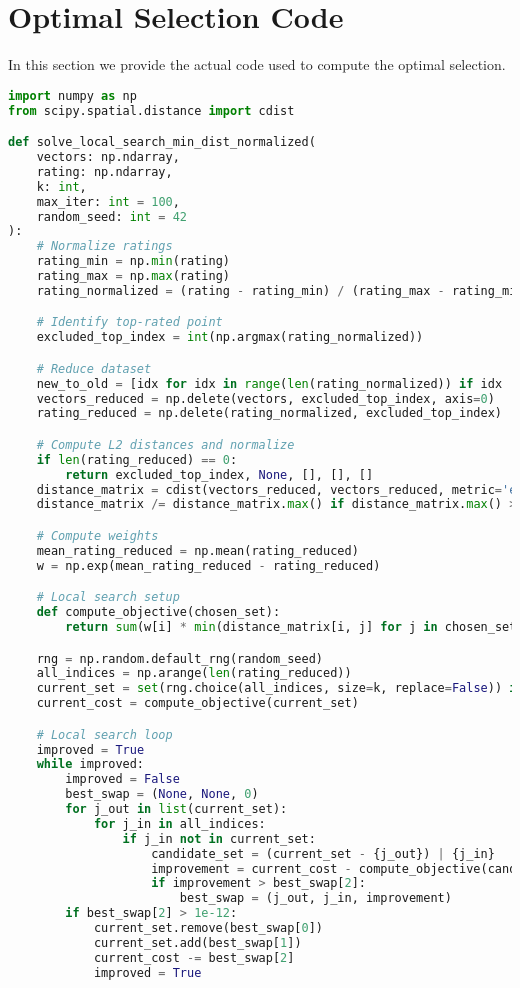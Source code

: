 \section{Optimal Selection Code}
\label{sec:optimal_selection_computation}

In this section we provide the actual code used to compute the optimal selection.

\begin{lstlisting}[language=Python]
import numpy as np
from scipy.spatial.distance import cdist

def solve_local_search_min_dist_normalized(
    vectors: np.ndarray,
    rating: np.ndarray,
    k: int,
    max_iter: int = 100,
    random_seed: int = 42
):
    # Normalize ratings
    rating_min = np.min(rating)
    rating_max = np.max(rating)
    rating_normalized = (rating - rating_min) / (rating_max - rating_min) if rating_max > rating_min else np.zeros_like(rating) + 0.5  

    # Identify top-rated point
    excluded_top_index = int(np.argmax(rating_normalized))

    # Reduce dataset
    new_to_old = [idx for idx in range(len(rating_normalized)) if idx != excluded_top_index]
    vectors_reduced = np.delete(vectors, excluded_top_index, axis=0)
    rating_reduced = np.delete(rating_normalized, excluded_top_index)

    # Compute L2 distances and normalize
    if len(rating_reduced) == 0:
        return excluded_top_index, None, [], [], []
    distance_matrix = cdist(vectors_reduced, vectors_reduced, metric='euclidean')
    distance_matrix /= distance_matrix.max() if distance_matrix.max() > 1e-12 else 1

    # Compute weights
    mean_rating_reduced = np.mean(rating_reduced)
    w = np.exp(mean_rating_reduced - rating_reduced)

    # Local search setup
    def compute_objective(chosen_set):
        return sum(w[i] * min(distance_matrix[i, j] for j in chosen_set) for i in range(len(w)))

    rng = np.random.default_rng(random_seed)
    all_indices = np.arange(len(rating_reduced))
    current_set = set(rng.choice(all_indices, size=k, replace=False)) if k < len(rating_reduced) else set(all_indices)
    current_cost = compute_objective(current_set)

    # Local search loop
    improved = True
    while improved:
        improved = False
        best_swap = (None, None, 0)
        for j_out in list(current_set):
            for j_in in all_indices:
                if j_in not in current_set:
                    candidate_set = (current_set - {j_out}) | {j_in}
                    improvement = current_cost - compute_objective(candidate_set)
                    if improvement > best_swap[2]:
                        best_swap = (j_out, j_in, improvement)
        if best_swap[2] > 1e-12:
            current_set.remove(best_swap[0])
            current_set.add(best_swap[1])
            current_cost -= best_swap[2]
            improved = True


\end{lstlisting}
